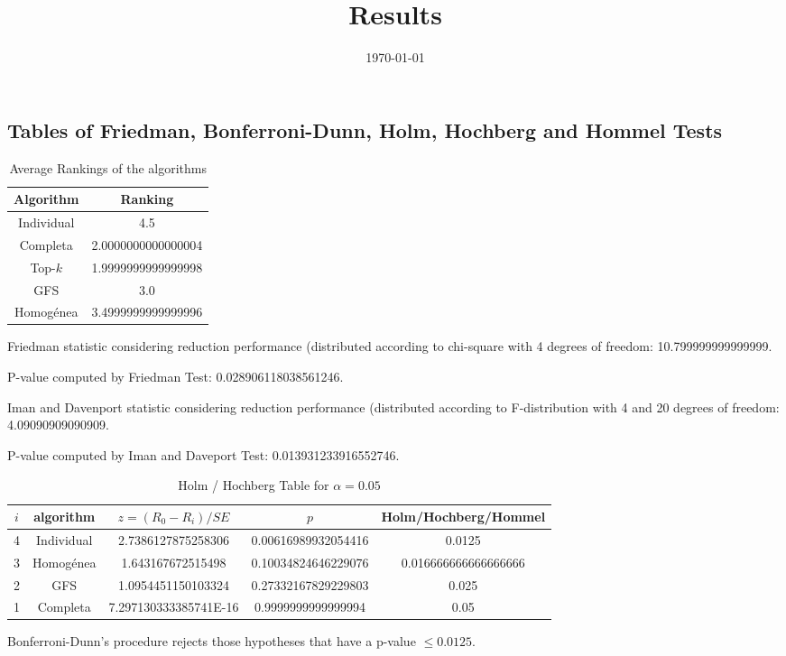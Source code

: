 \documentclass[a4paper,10pt]{article}
\title{Results}
\author{}
\date{\today}
\begin{document}
\begin{landscape}
\oddsidemargin 0in \topmargin 0in\maketitle
\section{Tables of Friedman, Bonferroni-Dunn, Holm, Hochberg and Hommel Tests}
\begin{table}[!htp]
\centering
\caption{Average Rankings of the algorithms
}\begin{tabular}{c|c}
Algorithm&Ranking\\
\hline
Individual&4.5\\
Completa&2.0000000000000004\\
Top-$k$&1.9999999999999998\\
GFS&3.0\\
Homogénea&3.4999999999999996\\
\end{tabular}
\end{table}


Friedman statistic considering reduction performance (distributed according to chi-square with 4 degrees of freedom: 10.799999999999999.


P-value computed by Friedman Test: 0.028906118038561246.\newline

Iman and Davenport statistic considering reduction performance (distributed according to F-distribution with 4 and 20 degrees of freedom: 4.09090909090909.


P-value computed by Iman and Daveport Test: 0.013931233916552746.\newline

\begin{table}[!htp]
\centering\tiny
\caption{Holm / Hochberg Table for $\alpha=0.05$}
\begin{tabular}{ccccc}
$i$&algorithm&$z=(R_0 - R_i)/SE$&$p$&Holm/Hochberg/Hommel\\
\hline
4&Individual&2.7386127875258306&0.00616989932054416&0.0125\\
3&Homogénea&1.643167672515498&0.10034824646229076&0.016666666666666666\\
2&GFS&1.0954451150103324&0.27332167829229803&0.025\\
1&Completa&7.297130333385741E-16&0.9999999999999994&0.05\\
\hline
\end{tabular}
\end{table}
Bonferroni-Dunn's procedure rejects those hypotheses that have a p-value $\le0.0125$.



\end{landscape}
\end{document}
